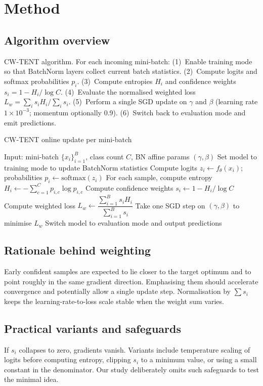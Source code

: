 \documentclass{article} %
\begin{document}
\section{Method}%
\label{sec:method}%
\subsection{Algorithm overview}
CW-TENT algorithm. For each incoming mini-batch: (1)~Enable training mode so that BatchNorm layers collect current batch statistics. (2)~Compute logits and softmax probabilities \(p_{i}\). (3)~Compute entropies \(H_{i}\) and confidence weights \(s_{i} = 1 - H_{i}/\log C\). (4)~Evaluate the normalised weighted loss \(L_{w} = \sum_{i} s_{i} H_{i} / \sum_{i} s_{i}\). (5)~Perform a single SGD update on \(\gamma\) and \(\beta\) (learning rate \(1\times 10^{-3}\); momentum optionally 0.9). (6)~Switch back to evaluation mode and emit predictions.

\begin{algorithm}
\caption{CW-TENT online update per mini-batch}
\begin{algorithmic}
  \State Input: mini-batch \(\{x_{i}\}_{{i=1}}^{B}\), class count \(C\), BN affine params \({(\gamma,\beta)}\)%
  \State Set model to training mode to update BatchNorm statistics%
  \State Compute logits \(z_{i} \leftarrow f_{\theta}(x_{i})\); probabilities \(p_{i} \leftarrow \mathrm{softmax}(z_{i})\)%
  \State For each sample, compute entropy \(H_{i} \leftarrow -\sum_{{c=1}}^{C} p_{i,c} \log p_{i,c}\)%
  \State Compute confidence weights \(s_{i} \leftarrow 1 - H_{i}/\log C\)%
  \State Compute weighted loss \(L_{w} \leftarrow \dfrac{\sum_{{i=1}}^{B} s_{i} H_{i}}{\sum_{{i=1}}^{B} s_{i}}\)%
  \State Take one SGD step on \({(\gamma,\beta)}\) to minimise \(L_{w}\)%
  \State Switch model to evaluation mode and output predictions%
\end{algorithmic}
\end{algorithm}

\subsection{Rationale behind weighting}
Early confident samples are expected to lie closer to the target optimum and to point roughly in the same gradient direction. Emphasising them should accelerate convergence and potentially allow a single update step. Normalisation by \(\sum s_{i}\) keeps the learning-rate-to-loss scale stable when the weight sum varies.

\subsection{Practical variants and safeguards}
If \(s_{i}\) collapses to zero, gradients vanish. Variants include temperature scaling of logits before computing entropy, clipping \(s_{i}\) to a minimum value, or using a small constant in the denominator. Our study deliberately omits such safeguards to test the minimal idea.
\end{document}
